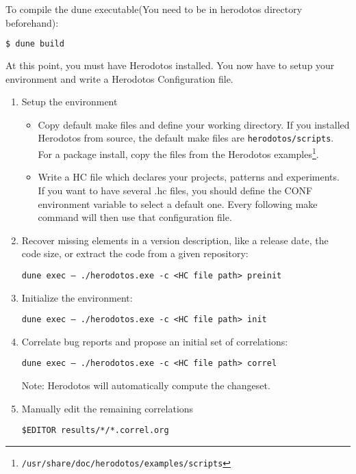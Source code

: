 
\label{chap:howto}

To compile the dune executable(You need to be in herodotos directory beforehand):
\begin{lstlisting}[language=bash]
  $ dune build
\end{lstlisting}


At this point, you must have Herodotos installed. You now have to
setup your environment and write a Herodotos Configuration file.

\begin{enumerate}
\item Setup the environment
  \begin{itemize}
  \item Copy default make files and define your working directory. If
    you installed Herodotos from source, the default make files are
    \texttt{herodotos/scripts}. For a package install, copy the files
    from the Herodotos
    examples\footnote{\texttt{/usr/share/doc/herodotos/examples/scripts}}.
  \item Write a HC file which declares your projects, patterns and experiments.\\
    If you want to have several .hc files, you should define the CONF
    environment variable to select a default one. Every following make
    command will then use that configuration file.
  \end{itemize}

\item Recover missing elements in a version description, like a release
  date, the code size, or extract the code from a given repository:

  \texttt{dune exec -- ./herodotos.exe -c <HC file path> preinit}
  
\item Initialize the environment:

  \texttt{dune exec -- ./herodotos.exe -c <HC file path> init}

\item Correlate bug reports and propose an initial set of
  correlations:

  \texttt{dune exec -- ./herodotos.exe -c <HC file path> correl}

  Note: Herodotos will automatically compute the changeset.

\item Manually edit the remaining correlations

  \texttt{\$EDITOR results/*/*.correl.org}


\end{enumerate}
